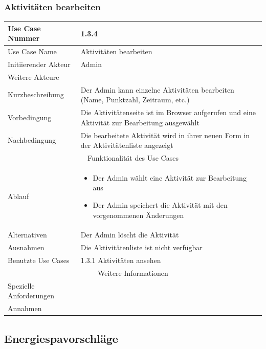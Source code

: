 \documentclass[10pt,a4paper]{article}
\begin{document}
	\subsubsection{Aktivit\"aten bearbeiten}
	\begin{tabular}{|l|p{.5\linewidth}|}
	\hline Use Case Nummer & 1.3.4 \\ 
	\hline Use Case Name & Aktivit\"aten bearbeiten \\ 
	\hline Initiierender Akteur & Admin \\
	\hline Weitere Akteure & \\
	\hline Kurzbeschreibung & Der Admin kann einzelne Aktivit\"aten bearbeiten (Name, Punktzahl, Zeitraum, etc.) \\
	\hline Vorbedingung & Die Aktivit\"atenseite ist im Browser aufgerufen und eine Aktivit\"at zur Bearbeitung ausgew\"ahlt \\
	\hline Nachbedingung & Die bearbeitete Aktivit\"at wird in ihrer neuen Form in der Aktivit\"atenliste angezeigt \\
	\hline \multicolumn{2}{|c|}{Funktionalität des Use Cases}\\
	\hline Ablauf & \begin{itemize}
			\item Der Admin w\"ahlt eine Aktivit\"at zur Bearbeitung aus
			\item Der Admin speichert die Aktivit\"at mit den vorgenommenen \"Anderungen
		\end{itemize} \\
	\hline Alternativen & Der Admin l\"oscht die Aktivit\"at \\
	\hline Ausnahmen & Die Aktivit\"atenliste ist nicht verf\"ugbar \\
	\hline Benutzte Use Cases & 1.3.1 Aktivit\"aten ansehen \\
	\hline \multicolumn{2}{|c|}{Weitere Informationen} \\
	\hline Spezielle Anforderungen & \\
	\hline Annahmen & \\
	\hline
	\end{tabular} 

\subsection{Energiespavorschl\"age}
\end{document}
